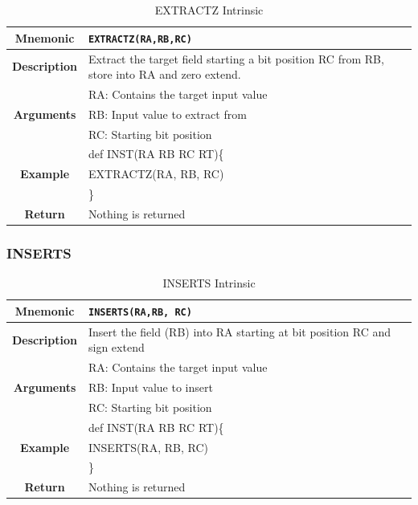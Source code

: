 \documentclass{article}
\begin{document}
\begin{table}[h]
\begin{center}
\caption{EXTRACTZ Intrinsic}
\vspace{0.125in}
\label{tab:EXTRACTZIntrinsic}
\begin{tabular}{|c|l|}
\hline
\textbf{Mnemonic} & \texttt{EXTRACTZ(RA,RB,RC)}\\
\hline
\textbf{Description} & Extract the target field starting a bit position RC from RB, store into RA and zero extend.\\
\hline
\multirow{3}{*}{\textbf{Arguments}} & RA: Contains the target input value\\
                          			     & RB: Input value to extract from \\
			                              & RC: Starting bit position\\
\hline
\multirow{3}{*}{\textbf{Example}} & def INST(RA RB RC RT)\{\\
                          			  &   EXTRACTZ(RA, RB, RC)\\
                                                    & \}\\
\hline
\textbf{Return} & Nothing is returned\\                                                    
\hline
\end{tabular}
\end{center}
\end{table}

\clearpage
\subsubsection{INSERTS}
\label{sec:INSERTS}

\begin{table}[h]
\begin{center}
\caption{INSERTS Intrinsic}
\vspace{0.125in}
\label{tab:INSERTSIntrinsic}
\begin{tabular}{|c|l|}
\hline
\textbf{Mnemonic} & \texttt{INSERTS(RA,RB, RC)}\\
\hline
\textbf{Description} & Insert the field (RB) into RA starting at bit position RC and sign extend\\
\hline
\multirow{3}{*}{\textbf{Arguments}} & RA: Contains the target input value\\
                          			     & RB: Input value to insert\\
			                              & RC: Starting bit position\\
\hline
\multirow{3}{*}{\textbf{Example}} & def INST(RA RB RC RT)\{\\
                          			  &   INSERTS(RA, RB, RC)\\
                                                    & \}\\
\hline
\textbf{Return} & Nothing is returned\\                                                    
\hline
\end{tabular}
\end{center}
\end{table}
\end{document}
